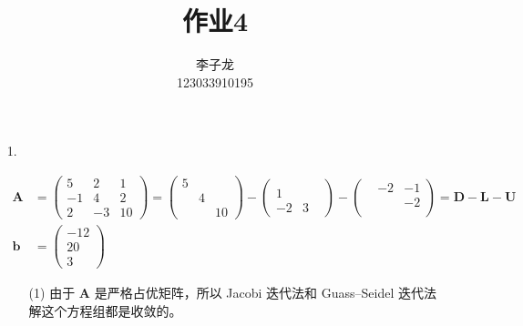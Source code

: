 \documentclass{sjtuarticle}
\title{作业4}
\author{李子龙\\123033910195}
\begin{document}
\maketitle

\begin{itemize}
    \item[1.]\begin{solution}
    \begin{align*}
        \bm{A}&=\begin{pmatrix}
            5 & 2 & 1 \\
            -1 & 4 & 2 \\
            2 & -3 & 10
        \end{pmatrix}=\begin{pmatrix}
            5\\ & 4\\ & & 10 
        \end{pmatrix}-\begin{pmatrix}
            \\ 1 \\ -2 & 3 &
        \end{pmatrix}-\begin{pmatrix}
            & -2 & -1 \\ & & -2 \\ &
        \end{pmatrix}=\bm{D}-\bm{L}-\bm{U} \\
        \bm{b}&=\begin{pmatrix}
            -12 \\ 20 \\ 3
        \end{pmatrix}
    \end{align*}
    \begin{itemize}
        \item[(1)] 由于 $\bm{A}$ 是严格占优矩阵，所以 Jacobi 迭代法和 Guass--Seidel 迭代法解这个方程组都是收敛的。


\end{itemize}
\end{solution}
\end{itemize}
\end{document}
